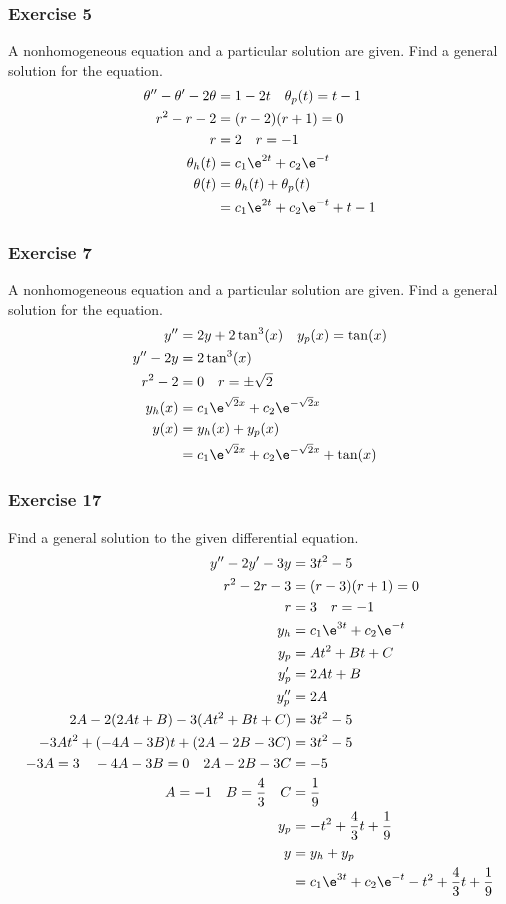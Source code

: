 \documentclass{math}
\begin{document}
\subsubsection*{Exercise 5}
A nonhomogeneous equation and a particular solution are given. Find a general
solution for the equation.
\begin{align*}
  \theta''-\theta'-2\theta &= 1-2t \quad \theta_p(t) = t-1 \\
  r^2-r-2 &= (r-2)(r+1) = 0 \\
  r &= 2 \quad r = -1 \\
  \theta_h(t) &= c_1\e^{2t}+c_2\e^{-t} \\
  \theta(t) &= \theta_h(t)+\theta_p(t) \\
  &= c_1\e^{2t}+c_2\e^{-t}+t-1
\end{align*}

\subsubsection*{Exercise 7}
A nonhomogeneous equation and a particular solution are given. Find a general
solution for the equation.
\begin{align*}
  y'' &= 2y+2\tan^3(x) \quad y_p(x) = \tan(x) \\
  y''-2y &= 2\tan^3(x) \\
  r^2-2 &= 0 \quad r = \pm\sqrt{2} \\
  y_h(x) &= c_1\e^{\sqrt{2}x}+c_2\e^{-\sqrt{2}x} \\
  y(x) &= y_h(x)+y_p(x) \\
  &= c_1\e^{\sqrt{2}x}+c_2\e^{-\sqrt{2}x}+\tan(x) \\
\end{align*}

\subsubsection*{Exercise 17}
Find a general solution to the given differential equation.
\begin{align*}
  y''-2y'-3y &= 3t^2-5 \\
  r^2-2r-3 &= (r-3)(r+1) = 0 \\
  r &= 3 \quad r = -1 \\
  y_h &= c_1\e^{3t}+c_2\e^{-t} \\
  y_p &= At^2+Bt+C \\
  y_p' &= 2At+B \\
  y_p'' &= 2A \\
  2A-2(2At+B)-3(At^2+Bt+C) &= 3t^2-5 \\
  -3At^2+(-4A-3B)t+(2A-2B-3C) &= 3t^2-5 \\
  -3A = 3 \quad -4A-3B = 0 \quad 2A-2B-3C &= -5 \\
  A = -1 \quad B = \frac{4}{3} \quad C &= \frac{1}{9} \\
  y_p &= -t^2+\frac{4}{3}t+\frac{1}{9} \\
  y &= y_h+y_p \\
  &= c_1\e^{3t}+c_2\e^{-t}-t^2+\frac{4}{3}t+\frac{1}{9}
\end{align*}
\end{document}
